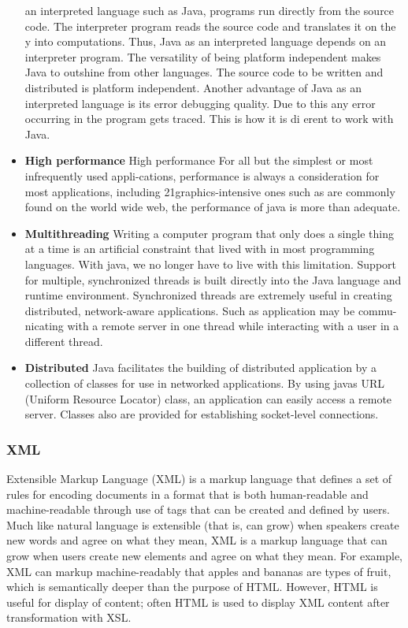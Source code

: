 \begin{itemize}
an interpreted language such as Java, programs run directly from the
source code.
The interpreter program reads the source code and translates it on the y
into computations. Thus, Java as an interpreted language depends on an
interpreter program.
The versatility of being platform independent makes Java to outshine from
other languages. The source code to be written and distributed is platform
independent.
Another advantage of Java as an interpreted language is its error
debugging quality. Due to this any error occurring in the program gets
traced. This is how it is di erent to work with Java.
\item \textbf{High performance}
High performance For all but the simplest or most infrequently used appli-cations,
performance is always a consideration for most applications, including
21graphics-intensive ones such as are commonly found on the world wide web,
the performance of java is more than adequate.
\item \textbf{Multithreading}
Writing a computer program that only does a single thing at a
time is an artificial constraint that lived with in most programming
languages. With java, we no longer have to live with this limitation. Support
for multiple, synchronized threads is built directly into the Java language
and runtime environment. Synchronized threads are extremely useful in
creating distributed, network-aware applications. Such as application may
be commu-nicating with a remote server in one thread while interacting
with a user in a different thread.
\item \textbf{Distributed}
Java facilitates the building of distributed application by a collection
of classes for use in networked applications. By using javas URL (Uniform
Resource Locator) class, an application can easily access a remote server.
Classes also are provided for establishing socket-level connections.


\end{itemize}

\subsubsection{XML}
Extensible Markup Language (XML) is a markup language that defines a set of rules for encoding documents in a format that is both human-readable and machine-readable through use of tags that can be created and defined by users. Much like natural language is extensible (that is, can grow) when speakers create new words and agree on what they mean, XML is a markup language that can grow when users create new elements and agree on what they mean. For example, XML can markup machine-readably that apples and bananas are types of fruit, which is semantically deeper than the purpose of HTML. However, HTML is useful for display of content; often HTML is used to display XML content after transformation with XSL.

